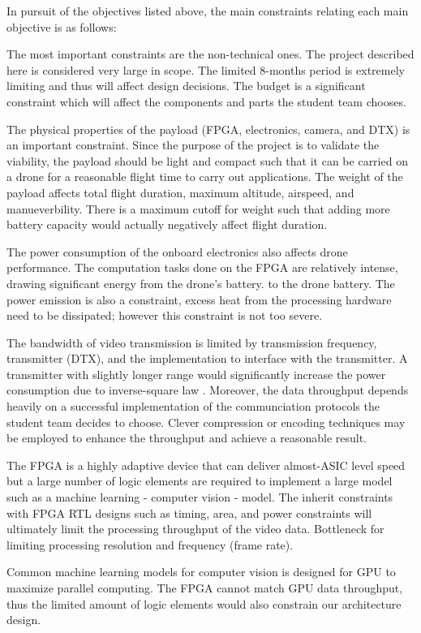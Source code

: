 In pursuit of the objectives listed above, the main constraints relating 
each main objective is as follows:

The most important constraints are the non-technical ones. The project described
here is considered very large in scope. The limited 8-months period is extremely
limiting and thus will affect design decisions. The budget is a significant
constraint which will affect the components and parts the student team chooses.

The physical properties of the payload (FPGA, electronics, camera, and  DTX) is an important constraint. Since the purpose of the project
is to validate the viability, the payload should be light and compact such
that it can be carried on a drone for a reasonable flight time to carry
out applications. The weight of the payload affects total flight duration, maximum altitude, airspeed, and manueverbility. 
There is a maximum cutoff for weight such that adding more battery capacity would actually negatively affect flight duration.

The power consumption of the onboard electronics also affects drone performance.
The computation tasks done on the FPGA are relatively intense, drawing significant energy from the drone's battery. 
to the drone battery. The power emission is also a constraint, excess heat from the processing
hardware need to be dissipated; however this constraint is not too severe.

The bandwidth of video transmission is limited by transmission frequency, transmitter (DTX), and
the implementation to interface with the transmitter. A transmitter with slightly longer range would
significantly increase the power consumption due to inverse-square law \cite{wiki-inverse-square}.
Moreover, the data throughput depends heavily on a successful implementation of the communciation
protocols the student team decides to choose. Clever compression or encoding techniques may be
employed to enhance the throughput and achieve a reasonable result.

The FPGA is a highly adaptive device that can deliver almost-ASIC level speed
but a large number of logic elements are required to implement a large model 
such as a machine learning - computer vision - model. The inherit constraints
with FPGA RTL designs such as timing, area, and power constraints will ultimately
limit the processing throughput of the video data. Bottleneck for limiting
processing resolution and frequency (frame rate).

Common machine learning models for computer vision is designed for GPU to
maximize parallel computing. The FPGA cannot match GPU data throughput, thus
the limited amount of logic elements would also constrain our architecture
design.
